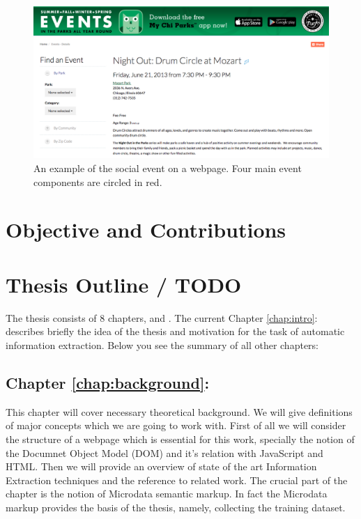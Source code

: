 \begin{figure}[h]
\begin{center}
\includegraphics[width=1.0\textwidth]{figures01/event_example}
\caption{An example of the social event on a webpage. Four main event components are circled in red.}
\label{fig:architecture}
\end{center}
\end{figure}



\section{Objective and Contributions}

\section{Thesis Outline / TODO}
The thesis consists of 8 chapters,  and . 
The current Chapter \ref{chap:intro}:  describes briefly the idea of the thesis and motivation for the task of automatic information extraction. Below you see the summary of all other chapters:
 
\subsection* {Chapter \ref{chap:background}: }
This chapter will cover necessary theoretical background. We will give definitions of major concepts which we are going to work with. First of all we will consider the structure of a webpage which is essential for this work, specially the notion of the Documnet Object Model (DOM) and it's relation with JavaScript and HTML. Then we will provide an overview of state of the art Information Extraction techniques and the reference to related work. The crucial part of the chapter is the notion of Microdata semantic markup. In fact the Microdata markup provides the basis of the thesis, namely, collecting the training dataset.  

